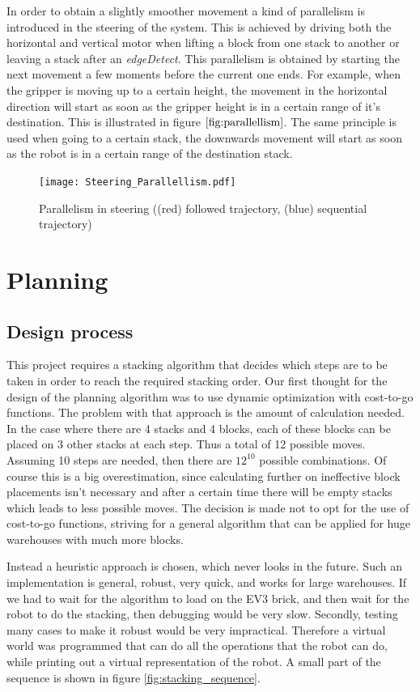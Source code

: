 \documentclass{article}
\begin{document}
	\par In order to obtain a slightly smoother movement a kind of parallelism is introduced in the steering of the system. This is achieved by driving both the horizontal and vertical motor when lifting a block from one stack to another or leaving a stack after an \textit{edgeDetect}. This parallelism is obtained by starting
	the next movement a few moments before the current one ends. For example, when the gripper is moving up to a certain height, the movement in the horizontal direction will start as soon as the gripper height is in a certain range of it’s destination. This is illustrated in figure $ \ref{fig:parallellism} $. The same principle is used when going to a certain stack, the downwards movement will start as soon as the robot is in a certain range of the destination stack. 
	
	\begin{figure}[H]
		\centering
		\texttt{[image: Steering\_Parallellism.pdf]}
		\caption{Parallelism in steering ((red) followed trajectory, (blue) sequential trajectory)}
		\label{fig:parallellism}		
	\end{figure}
	
	
	\section{Planning}
	\subsection{Design process}
	\par This project requires a stacking algorithm that decides which steps are to be taken in order to reach the required stacking order.
	Our first thought for the design of the planning algorithm was to use dynamic optimization with cost-to-go functions. 
	The problem with that approach is the amount of calculation needed. In the case where there are 4 stacks and 4 blocks, each of these blocks can be placed on 3 other stacks at each step. Thus a total of 12 possible moves.  Assuming 10 steps are needed, then there are $12^{10}$ possible combinations. Of course this is a big overestimation, since calculating further on ineffective block placements isn't necessary and after a certain time there will be empty stacks which leads to less possible moves. The decision is made not to opt for the use of cost-to-go functions, striving for a general algorithm that can be applied for huge warehouses with much more blocks. 
	
	\par Instead a heuristic approach is chosen, which never looks in the future. Such an implementation is general, robust, very quick, and works for large warehouses.
	If we had to wait for the algorithm to load on the EV3 brick, and then wait for the robot to do the stacking, then debugging would be very slow. Secondly, testing many cases to make it robust would be very impractical.
	Therefore a virtual world was programmed that can do all the operations that the robot can do, while printing out a virtual representation of the robot. A small part of the sequence is shown in figure \ref{fig:stacking_sequence}.
	
\end{document}
